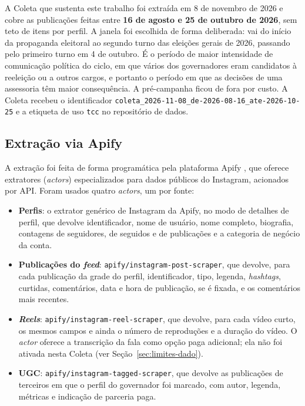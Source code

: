 A Coleta que sustenta este trabalho foi extraída em 8 de novembro de 2026 e cobre as publicações feitas entre \textbf{16 de agosto e 25 de outubro de 2026}, sem teto de itens por perfil. A janela foi escolhida de forma deliberada: vai do início da propaganda eleitoral ao segundo turno das eleições gerais de 2026, passando pelo primeiro turno em 4 de outubro. É o período de maior intensidade de comunicação política do ciclo, em que vários dos governadores eram candidatos à reeleição ou a outros cargos, e portanto o período em que as decisões de uma assessoria têm maior consequência. A pré-campanha ficou de fora por custo. A Coleta recebeu o identificador \texttt{coleta\_2026-11-08\_de-2026-08-16\_ate-2026-10-25} e a etiqueta de uso \texttt{tcc} no repositório de dados.

\subsection{Extração via Apify}

A extração foi feita de forma programática pela plataforma Apify \cite{apify2026}, que oferece extratores (\emph{actors}) especializados para dados públicos do Instagram, acionados por API. Foram usados quatro \emph{actors}, um por fonte:

\begin{itemize}
    \item \textbf{Perfis}: o extrator genérico de Instagram da Apify, no modo de detalhes de perfil, que devolve identificador, nome de usuário, nome completo, biografia, contagens de seguidores, de seguidos e de publicações e a categoria de negócio da conta.
    \item \textbf{Publicações do \emph{feed}}: \texttt{apify/instagram-post-scraper}, que devolve, para cada publicação da grade do perfil, identificador, tipo, legenda, \emph{hashtags}, curtidas, comentários, data e hora de publicação, se é fixada, e os comentários mais recentes.
    \item \textbf{\emph{Reels}}: \texttt{apify/instagram-reel-scraper}, que devolve, para cada vídeo curto, os mesmos campos e ainda o número de reproduções e a duração do vídeo. O \emph{actor} oferece a transcrição da fala como opção paga adicional; ela não foi ativada nesta Coleta (ver Seção~\ref{sec:limites-dado}).
    \item \textbf{UGC}: \texttt{apify/instagram-tagged-scraper}, que devolve as publicações de terceiros em que o perfil do governador foi marcado, com autor, legenda, métricas e indicação de parceria paga.
\end{itemize}

